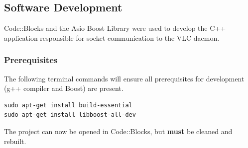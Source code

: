 \documentclass[a4paper,11pt]{report}
\begin{document}
\subsection{Software Development}
Code::Blocks and the Asio Boost Library were used to develop the C++ application responsible for socket communication to the VLC daemon.

\subsubsection{Prerequisites}
The following terminal commands will ensure all prerequisites for development (g++ compiler and Boost) are present. 
\begin{lstlisting}
sudo apt-get install build-essential
sudo apt-get install libboost-all-dev
\end{lstlisting}
The project can now be opened in Code::Blocks, but \textbf{must} be cleaned and rebuilt.
\end{document}

